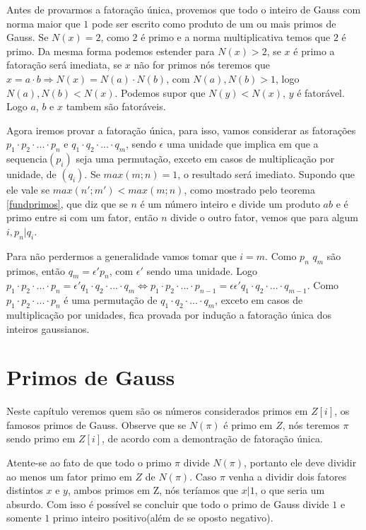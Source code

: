 Antes de provarmos a fatora\c{c}\~ao \'unica, provemos que todo o inteiro de Gauss com norma maior que $1$ pode ser escrito como produto de um ou mais primos de Gauss. Se $N(x)=2$, como $2$ \'e primo e a norma multiplicativa temos que $2$ \'e primo. Da mesma forma podemos estender para $N(x)>2$, se $x$ \'e primo a fatora\c{c}\~ao ser\'a imediata, se $x$ n\~ao for primos n\'os teremos que $x=a \cdot b \Rightarrow N(x) = N(a) \cdot N(b)$, com $ N(a), N(b) > 1$, logo $ N(a), N(b) < N(x)$. Podemos supor que $N(y) < N(x)$, $y$ \'e fator\'avel. Logo $a$, $b$ e $x$ tambem s\~ao fator\'aveis.

Agora iremos provar a fatora\c{c}\~ao \'unica, para isso, vamos considerar as fatora\c{c}\~oes $p_1 \cdot p_2 \cdot ... \cdot p_n$ e $q_1 \cdot q_2 \cdot ... \cdot q_m$, sendo $\epsilon$  uma unidade que implica em que a sequencia$(p_i)$ seja uma permuta\c{c}\~ao, exceto em casos de multiplica\c{c}\~ao por unidade, de $(q_i)$. Se $max(m;n) = 1$, o resultado ser\'a imediato. Supondo que ele vale se $max(n';m') < max(m;n)$, como mostrado pelo teorema \ref{fundprimos}, que diz que se $n$ \'e um n\'umero inteiro e divide um produto $ab$ e \'e primo entre si com um fator, ent\~ao $n$ divide o outro fator, vemos que para algum $i, p_n| q_i$.

Para n\~ao perdermos a generalidade vamos tomar que $i=m$. Como $p_n$  $q_m$ s\~ao primos, ent\~ao $q_m = \epsilon' p_n$, com $\epsilon'$ sendo uma unidade. Logo $p_1 \cdot p_2 \cdot ... \cdot p_n = \epsilon'q_1 \cdot q_2 \cdot ... \cdot q_m \Leftrightarrow p_1 \cdot p_2 \cdot ... \cdot p_{n-1} = \epsilon\epsilon'q_1 \cdot q_2 \cdot ... \cdot q_{m-1} $. Como $p_1 \cdot p_2 \cdot ... \cdot p_n$ \'e uma permuta\c{c}\~ao de $q_1 \cdot q_2 \cdot ... \cdot q_m$, exceto em casos de multiplica\c{c}\~ao por unidades, fica provada por indu\c{c}\~ao a fatora\c{c}\~ao \'unica dos inteiros gaussianos.

\section{Primos de Gauss}

\hspace{7mm}Neste cap\'itulo veremos quem s\~ao os n\'umeros considerados primos em $Z[i]$, os famosos primos de Gauss. Observe que se $N(\pi)$ \'e primo em $Z$, n\'os teremos $\pi$ sendo primo em $Z[i]$, de acordo com a demontra\c{c}\~ao de fatora\c{c}\~ao \'unica. 

Atente-se ao fato de que todo o primo $\pi$ divide $N(\pi)$, portanto ele deve dividir ao menos um fator primo em $Z$ de $N(\pi)$. Caso $\pi$ venha a dividir dois fatores distintos $x$ e $y$, ambos primos em Z, n\'os ter\'iamos que $x|1$, o que seria um absurdo. Com isso \'e poss\'ivel se concluir que todo o primo de Gauss divide $1$ e somente $1$ primo inteiro positivo(al\'em de se oposto negativo).


